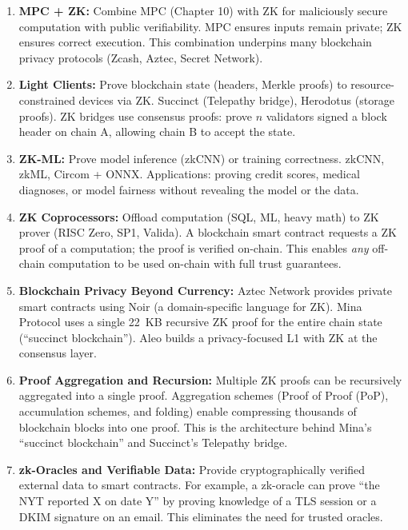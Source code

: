 \begin{enumerate}
\item \textbf{MPC + ZK:} Combine MPC (Chapter 10) with ZK for maliciously secure computation with public verifiability. MPC ensures inputs remain private; ZK ensures correct execution. This combination underpins many blockchain privacy protocols (Zcash, Aztec, Secret Network).

\item \textbf{Light Clients:} Prove blockchain state (headers, Merkle proofs) to resource-constrained devices via ZK. Succinct (Telepathy bridge), Herodotus (storage proofs). ZK bridges use consensus proofs: prove $n$ validators signed a block header on chain A, allowing chain B to accept the state.

\item \textbf{ZK-ML:} Prove model inference (zkCNN) or training correctness. zkCNN, zkML, Circom + ONNX. Applications: proving credit scores, medical diagnoses, or model fairness without revealing the model or the data.

\item \textbf{ZK Coprocessors:} Offload computation (SQL, ML, heavy math) to ZK prover (RISC Zero, SP1, Valida). A blockchain smart contract requests a ZK proof of a computation; the proof is verified on-chain. This enables \emph{any} off-chain computation to be used on-chain with full trust guarantees.

\item \textbf{Blockchain Privacy Beyond Currency:} Aztec Network provides private smart contracts using Noir (a domain-specific language for ZK). Mina Protocol uses a single 22~KB recursive ZK proof for the entire chain state (``succinct blockchain''). Aleo builds a privacy-focused L1 with ZK at the consensus layer.

\item \textbf{Proof Aggregation and Recursion:} Multiple ZK proofs can be recursively aggregated into a single proof. Aggregation schemes (Proof of Proof (PoP), accumulation schemes, and folding) enable compressing thousands of blockchain blocks into one proof. This is the architecture behind Mina's ``succinct blockchain'' and Succinct's Telepathy bridge.

\item \textbf{zk-Oracles and Verifiable Data:} Provide cryptographically verified external data to smart contracts. For example, a zk-oracle can prove ``the NYT reported X on date Y'' by proving knowledge of a TLS session or a DKIM signature on an email. This eliminates the need for trusted oracles.


\end{enumerate}
